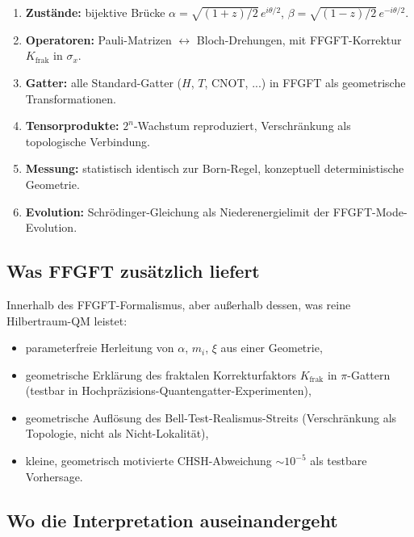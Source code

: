 \begin{enumerate}[leftmargin=2em,itemsep=2pt,topsep=2pt]
  \item \textbf{Zustände:} bijektive Brücke
        $\alpha = \sqrt{(1+z)/2}\,e^{i\theta/2}$,
        $\beta = \sqrt{(1-z)/2}\,e^{-i\theta/2}$.
  \item \textbf{Operatoren:} Pauli-Matrizen $\leftrightarrow$
        Bloch-Drehungen, mit FFGFT-Korrektur $K_{\text{frak}}$ in
        $\sigma_x$.
  \item \textbf{Gatter:} alle Standard-Gatter ($H$, $T$, CNOT, ...)
        in FFGFT als geometrische Transformationen.
  \item \textbf{Tensorprodukte:} $2^n$-Wachstum reproduziert,
        Verschränkung als topologische Verbindung.
  \item \textbf{Messung:} statistisch identisch zur Born-Regel,
        konzeptuell deterministische Geometrie.
  \item \textbf{Evolution:} Schrödinger-Gleichung als
        Niederenergielimit der FFGFT-Mode-Evolution.
\end{enumerate}

\subsection*{Was FFGFT zusätzlich liefert}

Innerhalb des FFGFT-Formalismus, aber außerhalb dessen, was reine
Hilbertraum-QM leistet:

\begin{itemize}[leftmargin=2em,itemsep=2pt,topsep=2pt]
  \item parameterfreie Herleitung von $\alpha$, $m_i$, $\xi$
        aus einer Geometrie,
  \item geometrische Erklärung des fraktalen Korrekturfaktors
        $K_{\text{frak}}$ in $\pi$-Gattern (testbar in
        Hochpräzisions-Quantengatter-Experimenten),
  \item geometrische Auflösung des Bell-Test-Realismus-Streits
        (Verschränkung als Topologie, nicht als Nicht-Lokalität),
  \item kleine, geometrisch motivierte CHSH-Abweichung
        $\sim 10^{-5}$ als testbare Vorhersage.
\end{itemize}

\subsection*{Wo die Interpretation auseinandergeht}

